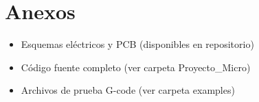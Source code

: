 \documentclass[a4paper,12pt]{article}
\begin{document}
\section{Anexos}
\begin{itemize}
    \item Esquemas eléctricos y PCB (disponibles en repositorio)
    \item Código fuente completo (ver carpeta Proyecto\_Micro)
    \item Archivos de prueba G-code (ver carpeta examples)
\end{itemize}
\end{document}
